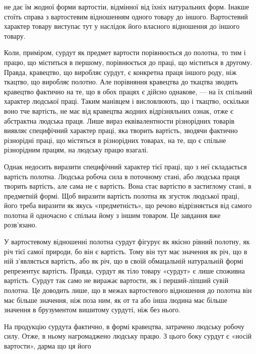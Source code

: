 \parcont{}  %
не дає їм жодної форми вартостіи, відмінної від їхніх натуральних форм. Інакше стоїть справа з
вартостевим відношенням одного товару до іншого. Вартостевий характер товару виступає тут у наслідок
його власного відношення до іншого товару.

Коли, приміром, сурдут як предмет вартости порівнюється до полотна, то тим і працю, що міститься в
першому, порівнюється до праці, що міститься в другому. Правда, кравецтво, що виробляє сурдут, є
конкретна праця іншого роду, ніж ткацтво, що виробляє полотно. Але порівняння кравецтва до ткацтва
зводить кравецтво фактично на те, що в обох працях є дійсно однакове, — на їх спільний характер
людської праці. Таким манівцем і висловлюють, що і ткацтво, оскільки воно тче вартість, не має від
кравецтва жодних відрізняльних ознак, отже є абстрактна людська праця. Лише вираз еквівалентности
різнорідних товарів виявляє специфічний характер праці, яка творить вартість, зводячи фактично
різнорідні праці, що містяться в різнорідних товарах, на те, що є спільне різнорідним працям, на
людську працю взагалі.

Однак недосить виразити специфічний характер тієї праці, що з неї складається вартість полотна.
Людська робоча сила в поточному стані, або людська праця творить вартість, але сама не є вартість.
Вона стає вартістю в застиглому стані, в предметній формі. Щоб виразити вартість полотна як згусток
людської праці, його треба виразити як якусь «предметність», що речово відрізняється від самого
полотна й одночасно є спільна йому з іншим товаром. Це завдання вже розв’язано.

У вартостевому відношенні полотна сурдут фігурує як якісно рівний полотну, як річ тієї самої
природи, бо він є вартість. Тому він тут має значення як річ, що в ній з’являється вартість, або як
річ, що в своїй обмацальній натуральній формі репрезентує вартість. Правда, сурдут як тіло товару
«сурдут» є лише споживна вартість. Сурдут так само не виражає вартости, як і перший-ліпший сувій
полотна. Це доводить лише, що в межах вартостевого відношення до полотна він має більше значення,
ніж поза ним, як от та або інша людина має більше значення в брузументом вишитому сурдуті, ніж без
нього.

На продукцію сурдута фактично, в формі кравецтва, затрачено людську робочу силу. Отже, в ньому
нагромаджено людську працю. З цього боку сурдут є «носій вартости», дарма що ця його
\parbreak{}  %
